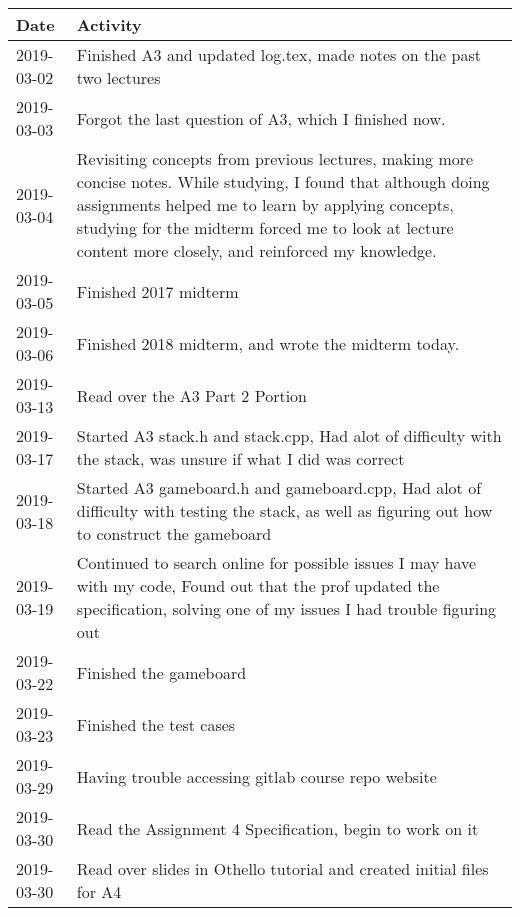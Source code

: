 \documentclass[12pt]{article}
\begin{document}
 \begin{tabular}{|p{2cm}| p{12cm}|} 
 \hline
 Date & Activity  \\ 
 
 \hline
        2019-03-02 & Finished A3 and updated log.tex, made notes on the past two lectures \\
 \hline
         2019-03-03 & Forgot the last question of A3, which I finished now. \\
 \hline
          2019-03-04 & Revisiting concepts from previous lectures, making more concise notes. While studying, I found that although doing assignments helped me to learn by applying concepts, studying for the midterm forced me to look at lecture content more closely, and reinforced my knowledge.  \\
 \hline
    2019-03-05 & Finished 2017 midterm  \\
 \hline
    2019-03-06 & Finished 2018 midterm, and wrote the midterm today.  \\
 \hline
     2019-03-13 & Read over the A3 Part 2 Portion  \\
 \hline
     2019-03-17 & Started A3 stack.h and stack.cpp, Had alot of difficulty with the stack, was unsure if what I did was correct \\
 \hline
      2019-03-18 & Started A3 gameboard.h and gameboard.cpp, Had alot of difficulty with testing the stack, as well as figuring out how to construct the gameboard \\
 \hline	
       2019-03-19 & Continued to search online for possible issues I may have with my code, Found out that the prof updated the specification, solving one of my issues I had trouble figuring out \\
 \hline	
        2019-03-22 & Finished the gameboard \\
 \hline	
         2019-03-23 & Finished the test cases \\
 \hline	
          2019-03-29 & Having trouble accessing gitlab course repo website \\
 \hline	
           2019-03-30 & Read the Assignment 4 Specification, begin to work on it \\
 \hline
           2019-03-30 & Read over slides in Othello tutorial and created initial files for A4 \\
 \hline
\end{tabular}
\end{document}
